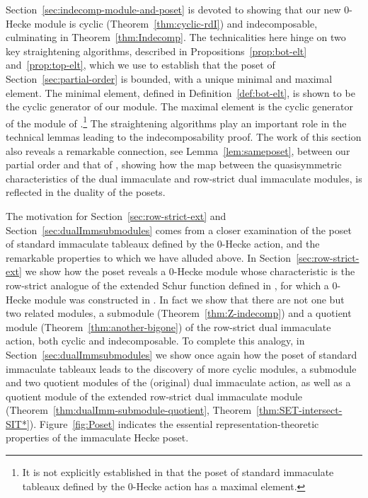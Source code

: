 \documentclass[12pt,letterpaper]{amsart}
\theoremstyle{definition}
\begin{document}
Section~\ref{sec:indecomp-module-and-poset} is devoted to showing that our new 0-Hecke module is cyclic (Theorem~\ref{thm:cyclic-rdI}) and indecomposable, culminating in Theorem~\ref{thm:Indecomp}.  The technicalities here hinge on two key straightening algorithms, described in Propositions~\ref{prop:bot-elt} and~\ref{prop:top-elt}, which we use to establish that the poset of Section~\ref{sec:partial-order} is bounded, with a unique minimal and maximal element.  The minimal element, defined in Definition~\ref{def:bot-elt}, is shown to be the cyclic generator of our module. The maximal element is the cyclic generator of the module of \cite{BBSSZ2015}.\footnote{It is not explicitly established in \cite{BBSSZ2015} that the poset of standard immaculate tableaux defined by the 0-Hecke action has a maximal element.} The straightening algorithms play an important role in the technical lemmas leading to the indecomposability proof.  The work of this section also reveals a remarkable connection, see  Lemma~\ref{lem:sameposet}, between our partial order and that of \cite{BBSSZ2015}, showing how the map  between the quasisymmetric characteristics of the dual immaculate and row-strict dual immaculate modules, is reflected in the duality of the posets.

The motivation for Section~\ref{sec:row-strict-ext} and Section~\ref{sec:dualImmsubmodules} comes from  a closer examination of the poset of standard immaculate tableaux defined by the 0-Hecke action, and the remarkable properties to which we have alluded above.  In Section~\ref{sec:row-strict-ext} we show how the poset reveals a 0-Hecke module whose characteristic is the row-strict analogue of the extended Schur function defined in \cite{AS2019}, for which a 0-Hecke module was constructed in \cite{S2020}.   In fact we show that there are not one but two related modules, a submodule  (Theorem~\ref{thm:Z-indecomp}) and a quotient module (Theorem~\ref{thm:another-bigone}) of the row-strict dual immaculate action, both cyclic and indecomposable.  To complete this analogy,  in Section~\ref{sec:dualImmsubmodules} we show once again how the poset of standard immaculate tableaux leads to the discovery of  more cyclic modules, a submodule and two quotient modules of the (original) dual immaculate action, as well as a quotient module of the extended row-strict dual immaculate module (Theorem~\ref{thm:dualImm-submodule-quotient}, Theorem~\ref{thm:SET-intersect-SIT*}).     Figure~\ref{fig:Poset} indicates the essential representation-theoretic properties of the immaculate Hecke  poset.
\end{document}

